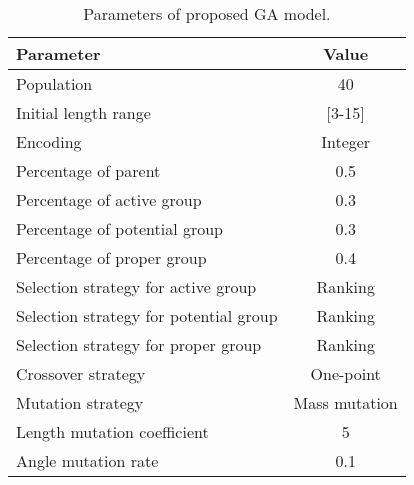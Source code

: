 \begin{table}[!htb]
\centering
\caption{Parameters of proposed GA model.}
\begin{adjustbox}{width=0.45\textwidth}
\label{tab:ga}
\begin{tabular}{lc}
\toprule
Parameter								&  Value  \\
\midrule
Population                              & 40        \\
Initial length range					& [3-15]    \\
Encoding								& Integer   \\
Percentage of parent                    & 0.5   \\
Percentage of active group				& 0.3   \\
Percentage of potential group			& 0.3   \\
Percentage of proper group				& 0.4   \\
Selection strategy for  active group	& Ranking   \\
Selection strategy for potential group	& Ranking   \\
Selection strategy for proper group	    & Ranking   \\
Crossover strategy			    		& One-point \\
Mutation strategy			    		& Mass mutation \\
Length mutation coefficient             & 5 \\
Angle mutation rate                     & 0.1 \\
\bottomrule
\end{tabular}
\end{adjustbox}
\end{table}
